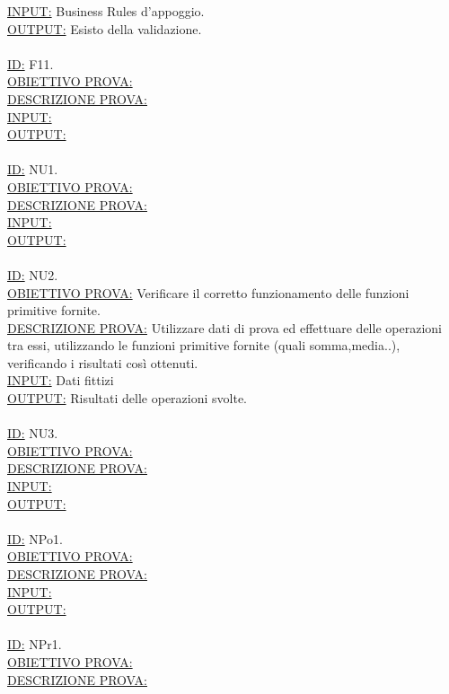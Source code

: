 \documentclass[11pt,titlepage,a4paper]{report}
\begin{document}
\underline{INPUT:} Business Rules d'appoggio. \\
\underline{OUTPUT:} Esisto della validazione. \\
\\
\underline{ID:} F11.\\
\underline{OBIETTIVO PROVA:} \\
\underline{DESCRIZIONE PROVA:}  \\
\underline{INPUT:}  \\
\underline{OUTPUT:}  \\
\\
\underline{ID:} NU1.\\
\underline{OBIETTIVO PROVA:} \\
\underline{DESCRIZIONE PROVA:}  \\
\underline{INPUT:}  \\
\underline{OUTPUT:}  \\
\\
\underline{ID:} NU2.\\
\underline{OBIETTIVO PROVA:} Verificare il corretto funzionamento delle funzioni primitive fornite.\\
\underline{DESCRIZIONE PROVA:} Utilizzare dati di prova ed effettuare delle operazioni tra essi, utilizzando le funzioni primitive fornite (quali somma,media..), verificando i risultati cos\`i ottenuti. \\
\underline{INPUT:} Dati fittizi \\
\underline{OUTPUT:} Risultati delle operazioni svolte. \\
\\
\underline{ID:} NU3.\\
\underline{OBIETTIVO PROVA:} \\
\underline{DESCRIZIONE PROVA:}  \\
\underline{INPUT:}  \\
\underline{OUTPUT:}  \\
\\
\underline{ID:} NPo1.\\
\underline{OBIETTIVO PROVA:}  \\
\underline{DESCRIZIONE PROVA:}  \\
\underline{INPUT:}  \\
\underline{OUTPUT:}  \\
\\
\underline{ID:} NPr1.\\
\underline{OBIETTIVO PROVA:}  \\
\underline{DESCRIZIONE PROVA:}  \\
\end{document}
